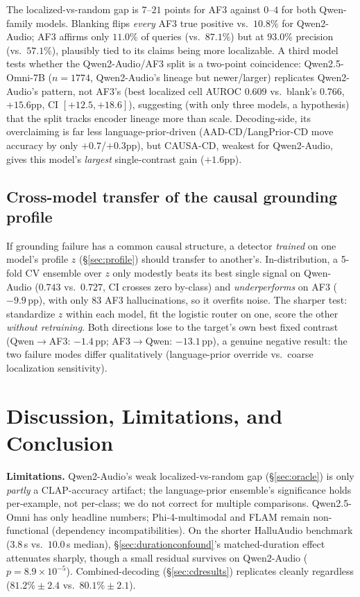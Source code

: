 \documentclass{article}
\newcommand{\qwenprofileauroc}{0.743}
\newcommand{\qwenprofilebest}{0.727}
\newcommand{\afprofilelossex}{-9.9}
\newcommand{\transferqaf}{-1.4}
\newcommand{\transferafq}{-13.1}
\begin{document}
The localized-vs-random gap is $7$--$21$ points for AF3 against
$0$--$4$ for both Qwen-family models. Blanking flips \emph{every} AF3
true positive vs.\ $10.8\%$ for Qwen2-Audio; AF3 affirms only $11.0\%$
of queries (vs.\ $87.1\%$) but at $93.0\%$ precision (vs.\
$57.1\%$), plausibly tied to its claims being more localizable. A
third model tests whether the Qwen2-Audio/AF3 split is a two-point
coincidence: Qwen2.5-Omni-7B ($n{=}1774$, Qwen2-Audio's lineage but
newer/larger) replicates Qwen2-Audio's pattern, not AF3's (best
localized cell AUROC $0.609$ vs.\ blank's $0.766$, $+15.6$pp, CI
$[+12.5,+18.6]$), suggesting (with only three models, a hypothesis)
that the split tracks encoder lineage more than scale. Decoding-side, its overclaiming is far less
language-prior-driven (AAD-CD/LangPrior-CD move accuracy by only
$+0.7$/$+0.3$pp), but CAUSA-CD, weakest for Qwen2-Audio, gives this
model's \emph{largest} single-contrast gain ($+1.6$pp).

\subsection{Cross-model transfer of the causal grounding profile}\label{sec:profileresults}

If grounding failure has a common causal structure, a detector
\emph{trained} on one model's profile $z$ (\S\ref{sec:profile}) should
transfer to another's. In-distribution, a 5-fold CV ensemble over $z$
only modestly beats its best single signal on Qwen-Audio
($\qwenprofileauroc$ vs.\ $\qwenprofilebest$, CI crosses zero by-class)
and \emph{underperforms} on AF3 ($\afprofilelossex$\,pp), with only 83
AF3 hallucinations, so it overfits noise. The sharper test: standardize $z$
within each model, fit the logistic router on one, score the other
\emph{without retraining}. Both directions lose to the target's own
best fixed contrast (Qwen$\to$AF3: $\transferqaf$\,pp; AF3$\to$Qwen:
$\transferafq$\,pp), a genuine negative result: the two failure modes
differ qualitatively (language-prior override vs.\ coarse localization
sensitivity).

\section{Discussion, Limitations, and Conclusion}

\textbf{Limitations.} Qwen2-Audio's weak localized-vs-random gap
(\S\ref{sec:oracle}) is only \emph{partly} a CLAP-accuracy artifact;
the language-prior ensemble's significance holds per-example, not
per-class; we do not correct for multiple comparisons. Qwen2.5-Omni
has only headline numbers; Phi-4-multimodal and FLAM \cite{wu2025flam}
remain non-functional (dependency incompatibilities). On the shorter
HalluAudio benchmark \cite{halluaudio2026} ($3.8$\,s vs.\ $10.0$\,s
median), \S\ref{sec:durationconfound}'s matched-duration effect
attenuates sharply, though a small residual survives on Qwen2-Audio
($p{=}8.9\times10^{-5}$). Combined-decoding (\S\ref{sec:cdresults})
replicates cleanly regardless ($81.2\%\pm2.4$ vs.\ $80.1\%\pm2.1$).
\end{document}
